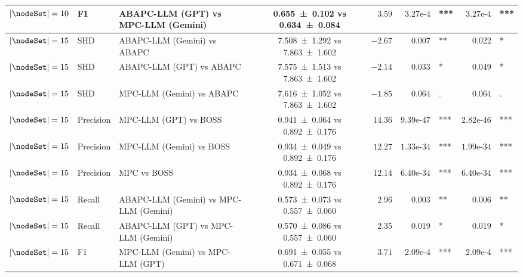 \begin{table}[t]
{\begin{tabular}{ll l|c|r|rl|rl}
    $|\nodeSet|=10$ & F1 & ABAPC-LLM (GPT) vs MPC-LLM (Gemini) & \num{0.655 +- 0.102} vs \num{0.634 +- 0.084} & $3.59$ & $3.27\text{e-}4$ & \!\!\!*** & $3.27\text{e-}4$ & \!\!\!*** \\
    \midrule
    $|\nodeSet|=15$ & SHD & ABAPC-LLM (Gemini) vs ABAPC & \num{7.508 +- 1.292} vs \num{7.863 +- 1.602} & $-2.67$ & $0.007$ & \!\!\!** & $0.022$ & \!\!\!* \\
    $|\nodeSet|=15$ & SHD & ABAPC-LLM (GPT) vs ABAPC & \num{7.575 +- 1.513} vs \num{7.863 +- 1.602} & $-2.14$ & $0.033$ & \!\!\!* & $0.049$ & \!\!\!* \\
    $|\nodeSet|=15$ & SHD & MPC-LLM (Gemini) vs ABAPC & \num{7.616 +- 1.052} vs \num{7.863 +- 1.602} & $-1.85$ & $0.064$ & \!\!\!. & $0.064$ & \!\!\!. \\
    $|\nodeSet|=15$ & Precision & MPC-LLM (GPT) vs BOSS & \num{0.941 +- 0.064} vs \num{0.892 +- 0.176} & $14.36$ & $9.39\text{e-}47$ & \!\!\!*** & $2.82\text{e-}46$ & \!\!\!*** \\
    $|\nodeSet|=15$ & Precision & MPC-LLM (Gemini) vs BOSS & \num{0.934 +- 0.049} vs \num{0.892 +- 0.176} & $12.27$ & $1.33\text{e-}34$ & \!\!\!*** & $1.99\text{e-}34$ & \!\!\!*** \\
    $|\nodeSet|=15$ & Precision & MPC vs BOSS & \num{0.934 +- 0.068} vs \num{0.892 +- 0.176} & $12.14$ & $6.40\text{e-}34$ & \!\!\!*** & $6.40\text{e-}34$ & \!\!\!*** \\
    $|\nodeSet|=15$ & Recall & ABAPC-LLM (Gemini) vs MPC-LLM (Gemini) & \num{0.573 +- 0.073} vs \num{0.557 +- 0.060} & $2.96$ & $0.003$ & \!\!\!** & $0.006$ & \!\!\!** \\
    $|\nodeSet|=15$ & Recall & ABAPC-LLM (GPT) vs MPC-LLM (Gemini) & \num{0.570 +- 0.086} vs \num{0.557 +- 0.060} & $2.35$ & $0.019$ & \!\!\!* & $0.019$ & \!\!\!* \\
    $|\nodeSet|=15$ & F1 & MPC-LLM (Gemini) vs MPC-LLM (GPT) & \num{0.691 +- 0.055} vs \num{0.671 +- 0.068} & $3.71$ & $2.09\text{e-}4$ & \!\!\!*** & $2.09\text{e-}4$ & \!\!\!*** \\
    \bottomrule
    \end{tabular}
    }
\end{table}
